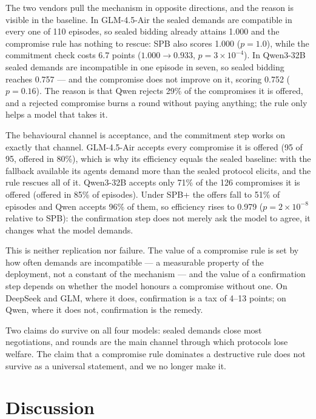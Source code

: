 \documentclass[11pt]{article}
\begin{document}
The two vendors pull the mechanism in opposite directions, and the reason is visible in the baseline. In GLM-4.5-Air the sealed demands are compatible in every one of 110 episodes, so sealed bidding already attains 1.000 and the compromise rule has nothing to rescue: SPB also scores 1.000 ($p=1.0$), while the commitment check costs 6.7 points ($1.000\to0.933$, $p=3\times10^{-4}$). In Qwen3-32B sealed demands are incompatible in one episode in seven, so sealed bidding reaches 0.757 --- and the compromise does not improve on it, scoring 0.752 ($p=0.16$). The reason is that Qwen rejects 29\% of the compromises it is offered, and a rejected compromise burns a round without paying anything; the rule only helps a model that takes it.

The behavioural channel is acceptance, and the commitment step works on exactly that channel. GLM-4.5-Air accepts every compromise it is offered (95 of 95, offered in 80\%), which is why its efficiency equals the sealed baseline: with the fallback available its agents demand more than the sealed protocol elicits, and the rule rescues all of it. Qwen3-32B accepts only 71\% of the 126 compromises it is offered (offered in 85\% of episodes). Under SPB+ the offers fall to 51\% of episodes and Qwen accepts 96\% of them, so efficiency rises to 0.979 ($p=2\times10^{-8}$ relative to SPB): the confirmation step does not merely ask the model to agree, it changes what the model demands.

This is neither replication nor failure. The value of a compromise rule is set by how often demands are incompatible --- a measurable property of the deployment, not a constant of the mechanism --- and the value of a confirmation step depends on whether the model honours a compromise without one. On DeepSeek and GLM, where it does, confirmation is a tax of 4--13 points; on Qwen, where it does not, confirmation is the remedy.

Two claims do survive on all four models: sealed demands close most negotiations, and rounds are the main channel through which protocols lose welfare. The claim that a compromise rule dominates a destructive rule does not survive as a universal statement, and we no longer make it.

\section{Discussion}
\label{sec:discussion}
\end{document}
